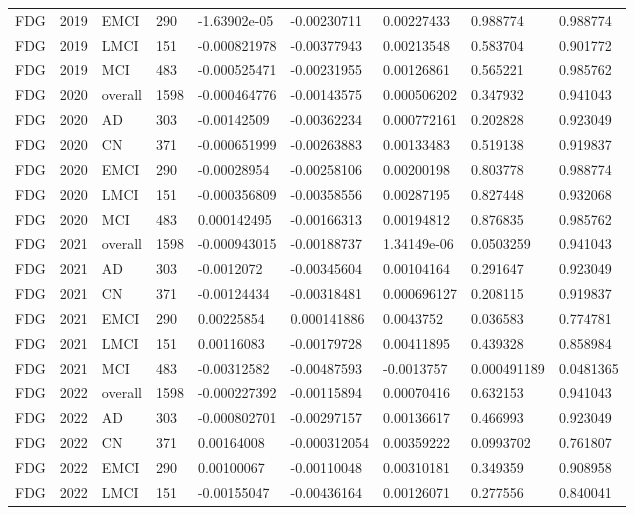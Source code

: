 \begin{landscape}
\begin{longtable}{lllllllll}
FDG & 2019 & EMCI & 290 & -1.63902e-05 & -0.00230711 & 0.00227433 & 0.988774 & 0.988774 \\
FDG & 2019 & LMCI & 151 & -0.000821978 & -0.00377943 & 0.00213548 & 0.583704 & 0.901772 \\
FDG & 2019 & MCI & 483 & -0.000525471 & -0.00231955 & 0.00126861 & 0.565221 & 0.985762 \\
FDG & 2020 & overall & 1598 & -0.000464776 & -0.00143575 & 0.000506202 & 0.347932 & 0.941043 \\
FDG & 2020 & AD & 303 & -0.00142509 & -0.00362234 & 0.000772161 & 0.202828 & 0.923049 \\
FDG & 2020 & CN & 371 & -0.000651999 & -0.00263883 & 0.00133483 & 0.519138 & 0.919837 \\
FDG & 2020 & EMCI & 290 & -0.00028954 & -0.00258106 & 0.00200198 & 0.803778 & 0.988774 \\
FDG & 2020 & LMCI & 151 & -0.000356809 & -0.00358556 & 0.00287195 & 0.827448 & 0.932068 \\
FDG & 2020 & MCI & 483 & 0.000142495 & -0.00166313 & 0.00194812 & 0.876835 & 0.985762 \\
FDG & 2021 & overall & 1598 & -0.000943015 & -0.00188737 & 1.34149e-06 & 0.0503259 & 0.941043 \\
FDG & 2021 & AD & 303 & -0.0012072 & -0.00345604 & 0.00104164 & 0.291647 & 0.923049 \\
FDG & 2021 & CN & 371 & -0.00124434 & -0.00318481 & 0.000696127 & 0.208115 & 0.919837 \\
FDG & 2021 & EMCI & 290 & 0.00225854 & 0.000141886 & 0.0043752 & 0.036583 & 0.774781 \\
FDG & 2021 & LMCI & 151 & 0.00116083 & -0.00179728 & 0.00411895 & 0.439328 & 0.858984 \\
FDG & 2021 & MCI & 483 & -0.00312582 & -0.00487593 & -0.0013757 & 0.000491189 & 0.0481365 \\
FDG & 2022 & overall & 1598 & -0.000227392 & -0.00115894 & 0.00070416 & 0.632153 & 0.941043 \\
FDG & 2022 & AD & 303 & -0.000802701 & -0.00297157 & 0.00136617 & 0.466993 & 0.923049 \\
FDG & 2022 & CN & 371 & 0.00164008 & -0.000312054 & 0.00359222 & 0.0993702 & 0.761807 \\
FDG & 2022 & EMCI & 290 & 0.00100067 & -0.00110048 & 0.00310181 & 0.349359 & 0.908958 \\
FDG & 2022 & LMCI & 151 & -0.00155047 & -0.00436164 & 0.00126071 & 0.277556 & 0.840041 \\

\end{longtable}
\end{landscape}
